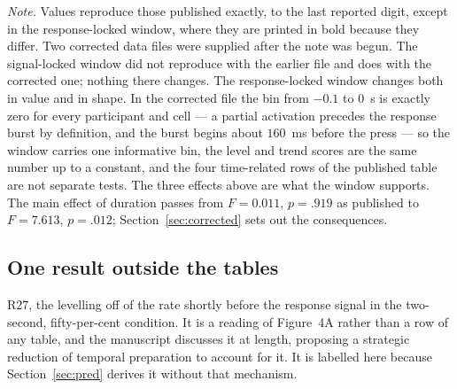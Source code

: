 \noindent\emph{Note.} Values reproduce those published exactly, to the last reported
digit, except in the response-locked window, where they are printed in bold because they
differ. Two corrected data files were supplied after the note was begun. The
signal-locked window did not reproduce with the earlier file and does with the corrected
one; nothing there changes. The response-locked window changes both in value and in
shape. In the corrected file the bin from $-0.1$ to $0$~s is exactly zero for every
participant and cell --- a partial activation precedes the response burst by definition,
and the burst begins about $160$~ms before the press --- so the window carries one
informative bin, the level and trend scores are the same number up to a constant, and the
four time-related rows of the published table are not separate tests. The three effects
above are what the window supports. The main effect of duration passes from $F=0.011$,
$p=.919$ as published to $F=7.613$, $p=.012$; Section~\ref{sec:corrected} sets out the
consequences.

\subsection*{One result outside the tables}

\noindent R27, the levelling off of the rate shortly before the response signal in the
two-second, fifty-per-cent condition. It is a reading of Figure~4A rather than a row of
any table, and the manuscript discusses it at length, proposing a strategic reduction of
temporal preparation to account for it. It is labelled here because
Section~\ref{sec:pred} derives it without that mechanism.

